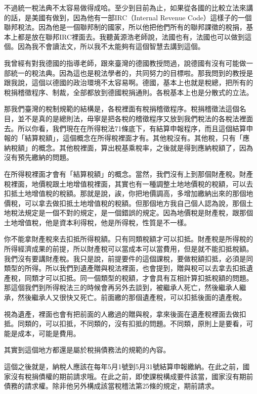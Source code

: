 \documentclass[oneside,sub3section]{ctexbook}
\begin{document}
不過統一稅法典不太容易做得成哈。至少到目前為止，如果從各國的比較立法來講的話，是美國有做到，因為他有一部IRC（Internal Revenue Code）這樣子的一個聯邦稅法。因為他是一個聯邦制的國家，所以他把他們所有的聯邦課徵的稅捐，基本上都是放在聯邦IRC裡面去。我聽黃源浩老師說，法國也有，法國也可以做到這個。因為我不會讀法文，所以我不太能夠有這個智慧去講到這個。

我曾經有對我德國的指導老師，跟來臺灣的德國教授問過，說德國有沒有可能做一部統一的稅法典。因為這也是稅法學者的，共同努力的目標啦。那我問到的教授是跟我說，這個以德國的政治環境不太容易啊。德國，基本上也就是稅總，把所有的稅捐稽徵程序、制裁，全部都放到德國稅捐通則。各稅基本上也是分散式的立法。

那我們臺灣的稅制規範的結構是，各稅裡面有稅捐稽徵程序。稅捐稽徵法這個名目，並不是真的是總則法，毋寧是把各稅的稽徵程序又放到我們稅法的各稅法裡面去。所以你看，我們現在在所得稅法71條底下，有結算申報程序，而且這個結算申報的「結算稅額」，這個概念在所得稅裡面才有。其他稅沒有。其他稅，只有「應納稅額」的概念。其他稅裡面，算出稅基乘稅率，之後就是得到應納稅額了，因為沒有預先繳納的問題。

在所得稅裡面才會有「結算稅額」的概念。當然，我們沒有上到那個財產稅。財產稅裡面，地價稅跟土地增值稅裡面，其實也有一種調整土地地價稅的稅額，可以去扣抵土地增值稅的稅額。那就是說，誒，你把地價調高，多增加繳納出來的那個地價稅，可以拿去做扣抵土地增值稅的稅額。但那個地方我自己個人認為說，那個土地稅法規定是一個不對的規定，是一個錯誤的規定。因為地價稅是財產稅，跟那個土地增值稅，他是資本利得稅，他是所得稅，性質是不一樣。

你不能拿財產稅來去扣抵所得稅額。只有同類稅額才可以扣抵。財產稅是所得稅的所得經濟成果的前提，所以財產稅可以當成本可以當費用，但是就不能扣抵稅額。我們沒有要講財產稅。我只是說，前提要件的這個課稅，要做稅額扣抵，必須是同類型的所得。所以我們到遺產贈與稅法裡面，也會提到，贈與稅可以去拿去扣抵遺產稅，同類才可以扣抵。同一個類型的稅額，才會具有互相計算扣抵稅額的問題。那這個我們到所得稅法三的時候會再另外去談到，被繼承人死亡，然後繼承人繼承，然後繼承人又很快又死亡。前面繳的那個遺產稅，可以扣抵後面的遺產稅。

視為遺產，裡面也會有把前面的人繳過的贈與稅，拿來後面在遺產稅裡面去做扣抵。同類的，可以扣抵，不同類的，沒有扣抵的問題。不同類，原則上是要看，可能是成本，可能是費用。

其實到這個地方都還是屬於稅捐債務法的規範的內容。

這個之後就是，納稅人應該在每年5月1號到5月31號結算申報繳納。在此之前，國家沒有稅捐債權的期前請求哦。在此之前，即使課稅構成要件該當，國家沒有期前債務的請求權。除非他另外構成該當稅稽法第25條的規定，期前請求。
\end{document}
